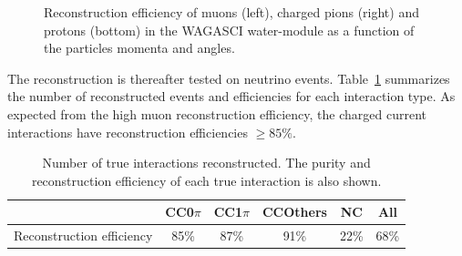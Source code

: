 \begin{figure}
\begin{subfigure}{.49\textwidth}
  \end{subfigure}
  \caption{\label{fig:efficiency_particle} Reconstruction efficiency of muons (left), charged pions (right) and protons (bottom) in the WAGASCI water-module as a function of the particles momenta and angles.}
\end{figure}


The reconstruction is thereafter tested on neutrino events. Table~\ref{tab:reconstructedinteractions} summarizes the number of reconstructed events and efficiencies for each interaction type. As expected from the high muon reconstruction efficiency, the charged current interactions have reconstruction efficiencies $\geq 85\%$.
\begin{table}[htb]
  \small
  \begin{center}
    \begin{tabular}{|c|c|c|c|c|c|}
      \hline
      \hline
      & CC0$\pi$ & CC1$\pi$ & CCOthers & NC & All \\
      \hline
      Reconstruction efficiency & 85\% & 87\% & 91\% & 22\% & 68\% \\
      \hline
      \hline
    \end{tabular}
    \caption{\label{tab:reconstructedinteractions} Number of true interactions reconstructed. The purity and reconstruction efficiency of each true interaction is also shown.}
  \end{center}
\end{table}

